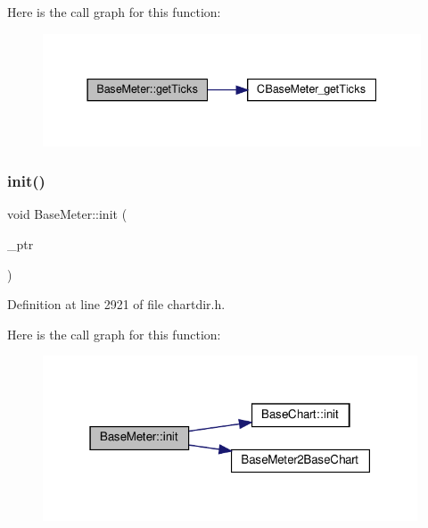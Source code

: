 Here is the call graph for this function\+:
\nopagebreak
\begin{figure}[H]
\begin{center}
\leavevmode
\includegraphics[width=337pt]{class_base_meter_aaab196f6d5ca6712f2486cb07277269c_cgraph}
\end{center}
\end{figure}
\mbox{\label{class_base_meter_a117c04249783d7acb72ed87dfa7ac92c}} 
\subsubsection{\texorpdfstring{init()}{init()}}
{\footnotesize\ttfamily void Base\+Meter\+::init (\begin{DoxyParamCaption}\item[{Base\+Meter\+Internal $\ast$}]{\+\_\+ptr }\end{DoxyParamCaption})\hspace{0.3cm}{\ttfamily [inline]}}



Definition at line 2921 of file chartdir.\+h.

Here is the call graph for this function\+:
\nopagebreak
\begin{figure}[H]
\begin{center}
\leavevmode
\includegraphics[width=315pt]{class_base_meter_a117c04249783d7acb72ed87dfa7ac92c_cgraph}
\end{center}
\end{figure}
\mbox{\label{class_base_meter_a1e93a1c74681f4fd32b93e068913efb7}} 
